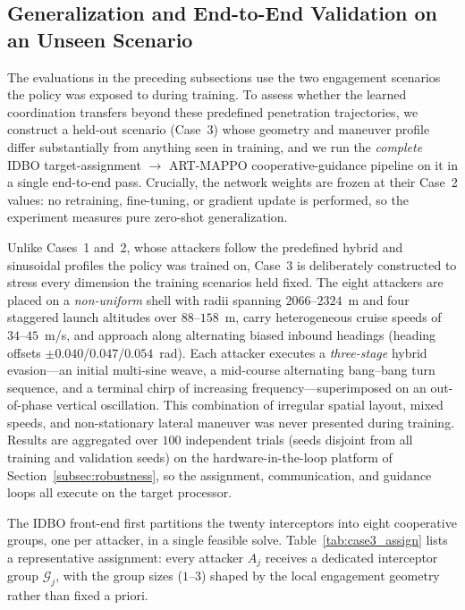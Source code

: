 \documentclass[lettersize,journal]{IEEEtran}
\newcommand{\hladd}[1]{{\color{blue}#1}}
\begin{document}
\subsection{\hladd{Generalization and End-to-End Validation on an Unseen Scenario}}
\label{subsec:generalization}

\hladd{The evaluations in the preceding subsections use the two engagement scenarios the policy was
exposed to during training. To assess whether the learned coordination transfers beyond these
predefined penetration trajectories, we construct a held-out scenario (Case~3) whose geometry and
maneuver profile differ substantially from anything seen in training, and we run the \emph{complete}
IDBO target-assignment $\rightarrow$ ART-MAPPO cooperative-guidance pipeline on it in a single
end-to-end pass. Crucially, the network weights are frozen at their Case~2 values: no retraining,
fine-tuning, or gradient update is performed, so the experiment measures pure zero-shot
generalization.}

\hladd{Unlike Cases~1 and~2, whose attackers follow the predefined hybrid and sinusoidal profiles the
policy was trained on, Case~3 is deliberately constructed to stress every dimension the training
scenarios held fixed. The eight attackers are placed on a \emph{non-uniform} shell with radii spanning
$2066$--$2324$~m and four staggered launch altitudes over $88$--$158$~m, carry heterogeneous cruise
speeds of $34$--$45$~m/s, and approach along alternating biased inbound headings (heading offsets
$\pm0.040$/$0.047$/$0.054$~rad). Each attacker executes a \emph{three-stage} hybrid evasion---an
initial multi-sine weave, a mid-course alternating bang--bang turn sequence, and a terminal chirp of
increasing frequency---superimposed on an out-of-phase vertical oscillation. This combination of
irregular spatial layout, mixed speeds, and non-stationary lateral maneuver was never presented during
training. Results are aggregated over $100$ independent trials (seeds disjoint from all training and
validation seeds) on the hardware-in-the-loop platform of Section~\ref{subsec:robustness}, so the
assignment, communication, and guidance loops all execute on the target processor.}

\hladd{The IDBO front-end first partitions the twenty interceptors into eight cooperative groups, one
per attacker, in a single feasible solve. Table~\ref{tab:case3_assign} lists a representative
assignment: every attacker $A_j$ receives a dedicated interceptor group $\mathcal{G}_j$, with the
group sizes ($1$--$3$) shaped by the local engagement geometry rather than fixed a priori.}
\end{document}
